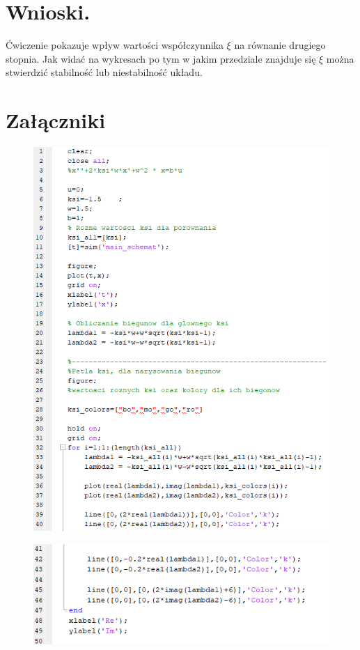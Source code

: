 \documentclass{article}
\begin{document}
\section{Wnioski.}


\par Ćwiczenie pokazuje wpływ wartości współczynnika $\xi$ na równanie drugiego stopnia. Jak widać na wykresach po tym w jakim przedziale znajduje się $\xi$ można stwierdzić stabilność lub niestabilność układu.
\newpage
\section{Załączniki}

 \begin{figure}[h!]
    \centering
    \includegraphics[scale=0.6]{kod1.png}
 \end{figure}
 
 \begin{figure}[h!]
    \centering
    \includegraphics[scale=0.6]{kod2.png}
 \end{figure}
\end{document}
